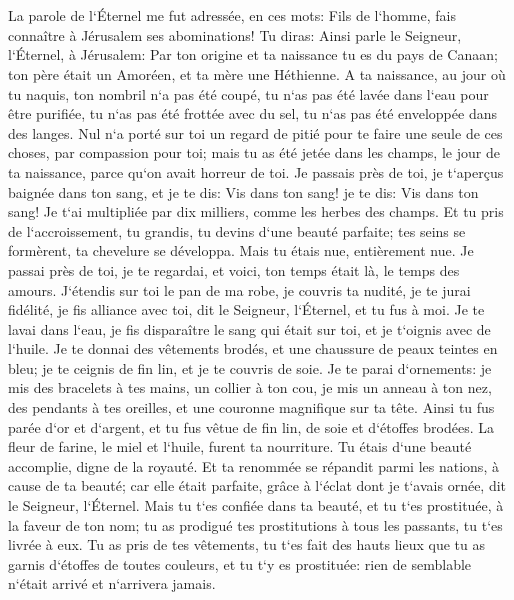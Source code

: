 \chapter{}

\verse La parole de l`Éternel me fut adressée, en ces mots: 
\verse Fils de l`homme, fais connaître à Jérusalem ses abominations! 
\verse Tu diras: Ainsi parle le Seigneur, l`Éternel, à Jérusalem: Par ton origine et ta naissance tu es du pays de Canaan; ton père était un Amoréen, et ta mère une Héthienne. 
\verse A ta naissance, au jour où tu naquis, ton nombril n`a pas été coupé, tu n`as pas été lavée dans l`eau pour être purifiée, tu n`as pas été frottée avec du sel, tu n`as pas été enveloppée dans des langes. 
\verse Nul n`a porté sur toi un regard de pitié pour te faire une seule de ces choses, par compassion pour toi; mais tu as été jetée dans les champs, le jour de ta naissance, parce qu`on avait horreur de toi. 
\verse Je passais près de toi, je t`aperçus baignée dans ton sang, et je te dis: Vis dans ton sang! je te dis: Vis dans ton sang! 
\verse Je t`ai multipliée par dix milliers, comme les herbes des champs. Et tu pris de l`accroissement, tu grandis, tu devins d`une beauté parfaite; tes seins se formèrent, ta chevelure se développa. Mais tu étais nue, entièrement nue. 
\verse Je passai près de toi, je te regardai, et voici, ton temps était là, le temps des amours. J`étendis sur toi le pan de ma robe, je couvris ta nudité, je te jurai fidélité, je fis alliance avec toi, dit le Seigneur, l`Éternel, et tu fus à moi. 
\verse Je te lavai dans l`eau, je fis disparaître le sang qui était sur toi, et je t`oignis avec de l`huile. 
\verse Je te donnai des vêtements brodés, et une chaussure de peaux teintes en bleu; je te ceignis de fin lin, et je te couvris de soie. 
\verse Je te parai d`ornements: je mis des bracelets à tes mains, un collier à ton cou, 
\verse je mis un anneau à ton nez, des pendants à tes oreilles, et une couronne magnifique sur ta tête. 
\verse Ainsi tu fus parée d`or et d`argent, et tu fus vêtue de fin lin, de soie et d`étoffes brodées. La fleur de farine, le miel et l`huile, furent ta nourriture. Tu étais d`une beauté accomplie, digne de la royauté. 
\verse Et ta renommée se répandit parmi les nations, à cause de ta beauté; car elle était parfaite, grâce à l`éclat dont je t`avais ornée, dit le Seigneur, l`Éternel. 
\verse Mais tu t`es confiée dans ta beauté, et tu t`es prostituée, à la faveur de ton nom; tu as prodigué tes prostitutions à tous les passants, tu t`es livrée à eux. 
\verse Tu as pris de tes vêtements, tu t`es fait des hauts lieux que tu as garnis d`étoffes de toutes couleurs, et tu t`y es prostituée: rien de semblable n`était arrivé et n`arrivera jamais. 
